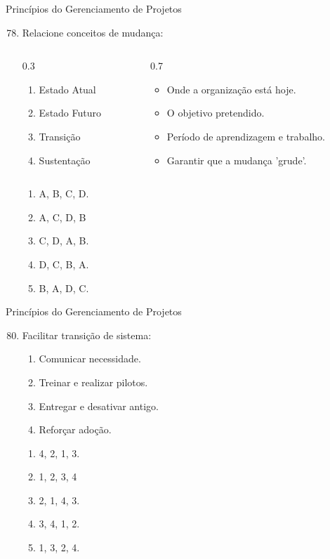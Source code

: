 \documentclass{beamer}
\begin{document}
\begin{frame}{Princípios do Gerenciamento de Projetos}
	\begin{enumerate}
		\setcounter{enumi}{77}
		\justifying
		\item Relacione conceitos de mudança:
		\begin{columns}
			\begin{column}{0.3\textwidth}
				\begin{enumerate}[A]
					\item Estado Atual
					\item Estado Futuro
					\item Transição
					\item Sustentação
				\end{enumerate}
			\end{column}
			\begin{column}{0.7\textwidth}
				\begin{itemize}
					\item Onde a organização está hoje.
					\item O objetivo pretendido.
					\item Período de aprendizagem e trabalho.
					\item Garantir que a mudança 'grude'.
				\end{itemize}
			\end{column}
		\end{columns}
		\begin{enumerate}[78]
			\item A, B, C, D.
			\item \alert<2>{A, C, D, B}
			\item C, D, A, B.
			\item D, C, B, A.
			\item B, A, D, C.
		\end{enumerate}
	\end{enumerate}
\end{frame}

\begin{frame}{Princípios do Gerenciamento de Projetos}
	\begin{enumerate}
		\setcounter{enumi}{79}
		\justifying
		\item Facilitar transição de sistema:
		\begin{enumerate}[I]
			\item Comunicar necessidade.
			\item Treinar e realizar pilotos.
			\item Entregar e desativar antigo.
			\item Reforçar adoção.
		\end{enumerate}
		\begin{enumerate}[a]
			\item 4, 2, 1, 3.
			\item \alert<2>{1, 2, 3, 4}
			\item 2, 1, 4, 3.
			\item 3, 4, 1, 2.
			\item 1, 3, 2, 4.
		\end{enumerate}
	\end{enumerate}
\end{frame}
\end{document}
